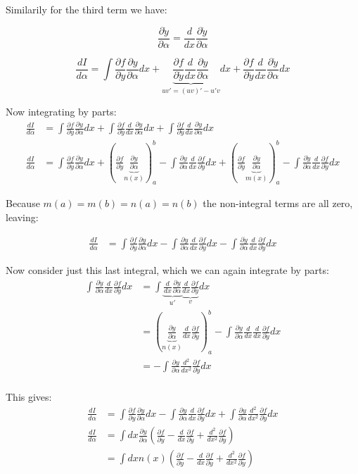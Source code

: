 \documentclass{article}
\newcommand{\ydot}[0]{\dot{y}}
\newcommand{\yddot}[0]{\ddot{y}}
\newcommand{\PD}[2]{\frac{\partial {#2}}{\partial {#1}}}
\begin{document}
Similarily for the third term we have:

\begin{equation*}
\PD{\alpha}{\ydot} = \frac{d}{ d x} \PD{\alpha}{\ydot}
\end{equation*}

\begin{equation*}
\frac{dI}{d\alpha} = 
\int \PD{y}{f} \PD{\alpha}{y} d x +
\underbrace{\PD{\ydot}{f} \frac{d}{ d x} \PD{\alpha}{y}}_{ u v' = (u v)' - u' v } d x
+\PD{\yddot}{f} \frac{d}{ d x} \PD{\alpha}{\ydot} d x
\end{equation*}

Now integrating by parts:
\begin{align*}
\frac{dI}{d\alpha} &= 
 \int \PD{y}{f} \PD{\alpha}{y} d x
+\int \PD{\ydot}{f} \frac{d}{ d x} \PD{\alpha}{y} d x
+\int \PD{\yddot}{f} \frac{d}{ d x} \PD{\alpha}{\ydot} d x \\
\frac{dI}{d\alpha} &= 
 \int \PD{y}{f} \PD{\alpha}{y} d x
+\left(\PD{\ydot}{f} \underbrace{\PD{\alpha}{y}}_{n(x)}\right)_a^b - \int \PD{\alpha}{y} \frac{d}{ d x} \PD{\ydot}{f} d x
+\left(\PD{\yddot}{f} \underbrace{\PD{\alpha}{\ydot}}_{m(x)} \right)_a^b
-\int \PD{\alpha}{\ydot} \frac{d}{ d x} \PD{\yddot}{f} d x
\end{align*}

Because $m(a) = m(b) = n(a) = n(b)$ the non-integral terms are all zero, leaving:

\begin{align*}
\frac{dI}{d\alpha} &= 
  \int \PD{y}{f} \PD{\alpha}{y} d x
- \int \PD{\alpha}{y} \frac{d}{ d x} \PD{\ydot}{f} d x
- \int \PD{\alpha}{\ydot} \frac{d}{ d x} \PD{\yddot}{f} d x
\end{align*}

Now consider just this last integral, which we can again integrate by parts:
\begin{align*}
\int \PD{\alpha}{\ydot} \frac{d}{ d x} \PD{\yddot}{f} d x
&= \int \underbrace{\frac{d}{dx} \PD{\alpha}{y}}_{u'} \underbrace{\frac{d}{ d x} \PD{\yddot}{f}}_{v} d x \\
&= 
\left( \underbrace{\PD{\alpha}{y}}_{n(x)} {\frac{d}{ d x} \PD{\yddot}{f}} \right)_a^b
-\int \PD{\alpha}{y} \frac{d}{dx} {\frac{d}{ d x} \PD{\yddot}{f}} d x \\
&= 
-\int \PD{\alpha}{y} \frac{d^2}{dx^2} \PD{\yddot}{f} d x \\
\end{align*}

This gives:
\begin{align*}
\frac{dI}{d\alpha} &= 
  \int \PD{y}{f} \PD{\alpha}{y} d x
- \int \PD{\alpha}{y} \frac{d}{ d x} \PD{\ydot}{f} d x
+ \int \PD{\alpha}{y} \frac{d^2}{dx^2} \PD{\yddot}{f} d x \\
\frac{dI}{d\alpha} 
&= \int d x \PD{\alpha}{y} \left( \PD{y}{f} - \frac{d}{ d x} \PD{\ydot}{f} + \frac{d^2}{dx^2} \PD{\yddot}{f} \right) \\
&= \int d x n(x) \left( \PD{y}{f} - \frac{d}{ d x} \PD{\ydot}{f} + \frac{d^2}{dx^2} \PD{\yddot}{f} \right)
\end{align*}
\end{document}
